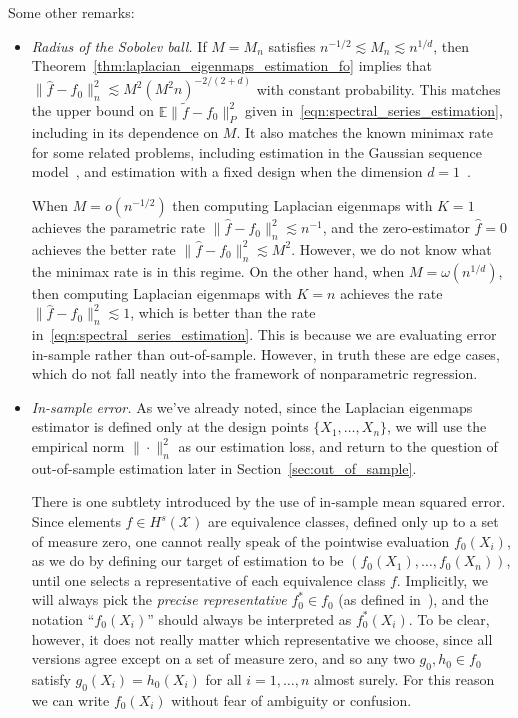 \documentclass{article}
\newcommand{\1}{\mathbf{1}}
\newcommand{\mc}[1]{\mathcal{#1}}
\newcommand{\Ebb}{\mathbb{E}}
\newcommand{\wt}[1]{\widetilde{#1}}
\newcommand{\wh}[1]{\widehat{#1}}
\theoremstyle{alden}
\theoremstyle{aldenthm}
\theoremstyle{definition}
\theoremstyle{remark}
\begin{document}
Some other remarks:
\begin{itemize}
	\item \emph{Radius of the Sobolev ball.} If $M = M_n$ satisfies $n^{-1/2} \lesssim M_n \lesssim n^{1/d}$, then Theorem~\ref{thm:laplacian_eigenmaps_estimation_fo} implies that $\|\wh{f} - f_0\|_n^2 \lesssim M^2(M^2n)^{-2/(2 + d)}$ with constant probability. This matches the upper bound on $\Ebb\|\wt{f} - f_0\|_P^2$ given in~\eqref{eqn:spectral_series_estimation}, including in its dependence on $M$. It also matches the known minimax rate for some related problems, including estimation in the Gaussian sequence model~\citep{johnstone2011}, and estimation with a fixed design when the dimension $d = 1$~\citep{vandergeer2000}. 
	
	When $M = o(n^{-1/2})$ then computing Laplacian eigenmaps with $K = 1$ achieves the parametric rate $\|\wh{f} - f_0\|_n^2 \lesssim n^{-1}$, and the zero-estimator $\wh{f} = 0$ achieves the better rate $\|\wh{f} - f_0\|_n^2 \lesssim M^2$. However, we do not know what the minimax rate is in this regime. On the other hand, when $M = \omega(n^{1/d})$, then computing Laplacian eigenmaps with $K = n$ achieves the rate $\|\wh{f} - f_0\|_n^2 \lesssim 1$, which is better than the rate in~\eqref{eqn:spectral_series_estimation}. This is because we are evaluating error in-sample rather than out-of-sample. However, in truth these are edge cases, which do not fall neatly into the framework of nonparametric regression. 
	
	\item \emph{In-sample error.} As we've already noted, since the Laplacian eigenmaps estimator is defined only at the design points $\{X_1,\ldots,X_n\}$, we will use the empirical norm $\|\cdot\|_n^2$ as our estimation loss, and return to the question of out-of-sample estimation later in Section~\ref{sec:out_of_sample}. 
	
	There is one subtlety introduced by the use of in-sample mean squared error. Since elements $f \in H^s(\mc{X})$ are equivalence classes, defined only up to a set of measure zero, one cannot really speak of the pointwise evaluation $f_0(X_i)$, as we do by defining our target of estimation to be $(f_0(X_1),\ldots,f_0(X_n))$, until one selects a representative of each equivalence class $f$. Implicitly, we will always pick the \emph{precise representative} $f_0^{\ast} \in f_0$ (as defined in~\cite{evans15}), and the notation ``$f_0(X_i)$'' should always be interpreted as $f_0^{\ast}(X_i)$. To be clear, however, it does not really matter which representative we choose, since all versions agree except on a set of measure zero, and so any two $g_0,h_0 \in f_0$ satisfy $g_0(X_i) = h_0(X_i)$ for all $i = 1,\ldots,n$ almost surely. For this reason we can write $f_0(X_i)$ without fear of ambiguity or confusion. 
	

\end{itemize}
\end{document}

